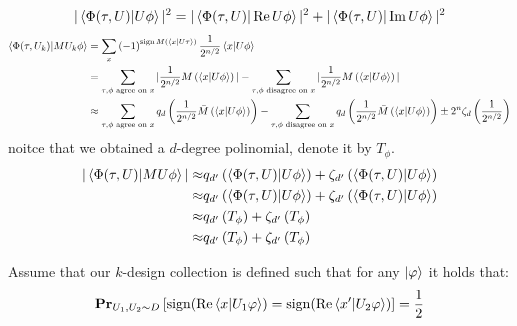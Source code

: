 \documentclass[manuscript,screen,review]{acmart}
\begin{document}
\begin{equation*}
  \begin{split}
    |\braket{\Phi(\tau,U)|U\phi}|^2 = | \braket{\Phi(\tau, U)|\Rea U\phi}|^2  +
    |\braket{\Phi(\tau,U)|\Ima U\phi}|^2
  \end{split}
\end{equation*}
\begin{equation*}
  \begin{split}
    \braket{\Phi(\tau,U_{k})|MU_{k}\phi} & = \sum_{x}{ \left( -1 \right)^{\sign
    M\left( \braket{x|U\tau} \right) } \frac{1}{2^{n/2}} \braket{x|U\phi} }\\
    & = \sum_{ \tau,\phi \text{ agree on } x}{ | \frac{1}{2^{n/2}}M \left(
    \braket{x|U\phi} \right)| } - \sum_{ \tau,\phi \text{ disagree on } x}{  |
    \frac{1}{2^{n/2}}M \left( \braket{x|U\phi} \right)| }  \\
    & \approx \sum_{ \tau,\phi \text{ agree on } x}{ q_{d}
    \left(\frac{1}{2^{n/2}}\bar{M} \left( \braket{x|U\phi} \right) \right) } -
    \sum_{ \tau,\phi \text{ disagree on } x}{  q_{d}\left(
    \frac{1}{2^{n/2}}\bar{M} \left( \braket{x|U\phi} \right) \right) }  \pm
    2^{n}\zeta_{d}\left(\frac{1}{2^{n/2}} \right)
  \end{split}
\end{equation*}
noitce that we obtained a $d$-degree polinomial, denote it by $T_{\phi}$.
\begin{equation*}
  \begin{split}
    | \braket{\Phi(\tau,U)|MU\phi} |  \approx & q_{d^{\prime}}\left(
    \braket{\Phi(\tau,U)|U\phi} \right) + \zeta_{d^{\prime}}\left(
    \braket{\Phi(\tau,U)|U\phi} \right) \\
    \approx & q_{d^{\prime}}\left( \braket{\Phi(\tau,U)|U\phi} \right) +
    \zeta_{d^{\prime}}\left( \braket{\Phi(\tau,U)|U\phi} \right)\\
    \approx & q_{d^{\prime}}\left(  T_{\phi}\right) + \zeta_{d^{\prime}}\left(
    T_{\phi} \right)\\
    \approx & q_{d^{\prime}}\left(  T_{\phi}\right) + \zeta_{d^{\prime}}\left(
    T_{\phi} \right)
  \end{split}
\end{equation*}

Assume that our $k$-design collection is defined such that for any
$\ket{\varphi}$ it holds that:
\begin{equation*}
  \begin{split}
    \prbm{  \sign(\Rea \braket{x|U_{1}\varphi} ) = \sign(\Rea
    \braket{x^{\prime}|U_{2}\varphi} )}{ U_{1},U_{2}\sim D } = \frac{1}{2}
  \end{split}
\end{equation*}
\end{document}
